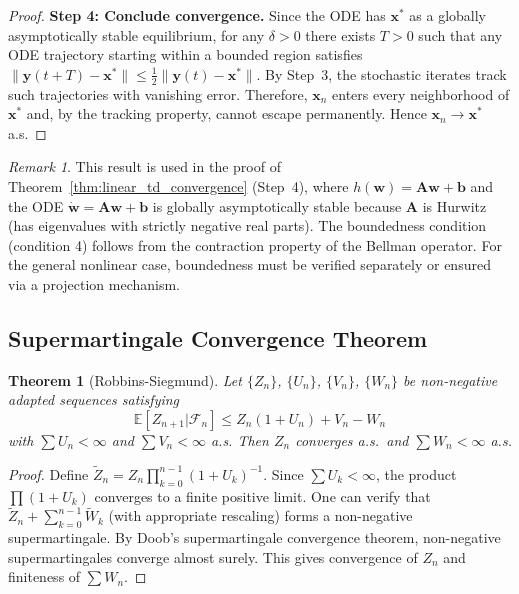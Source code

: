 \documentclass[11pt,a4paper]{article}
\theoremstyle{definition}
\theoremstyle{plain}
\newtheorem{theorem}{Theorem}[section]
\theoremstyle{remark}
\newtheorem{remark}{Remark}[section]
\newcommand{\E}{\mathbb{E}}
\begin{document}
\begin{proof}
\textbf{Step 4: Conclude convergence.} Since the ODE has $\bm{x}^*$ as a globally asymptotically stable equilibrium, for any $\delta > 0$ there exists $T > 0$ such that any ODE trajectory starting within a bounded region satisfies $\|\bm{y}(t+T) - \bm{x}^*\| \leq \frac{1}{2}\|\bm{y}(t) - \bm{x}^*\|$. By Step~3, the stochastic iterates track such trajectories with vanishing error. Therefore, $\bm{x}_n$ enters every neighborhood of $\bm{x}^*$ and, by the tracking property, cannot escape permanently. Hence $\bm{x}_n \to \bm{x}^*$ a.s.
\end{proof}

\begin{remark}
This result is used in the proof of Theorem~\ref{thm:linear_td_convergence} (Step~4), where $h(\bm{w}) = \bm{A}\bm{w} + \bm{b}$ and the ODE $\dot{\bm{w}} = \bm{A}\bm{w} + \bm{b}$ is globally asymptotically stable because $\bm{A}$ is Hurwitz (has eigenvalues with strictly negative real parts). The boundedness condition (condition 4) follows from the contraction property of the Bellman operator. For the general nonlinear case, boundedness must be verified separately or ensured via a projection mechanism.
\end{remark}

\subsection{Supermartingale Convergence Theorem}
\label{app:supermartingale}

\begin{theorem}[Robbins-Siegmund]
\label{thm:supermartingale}
Let $\{Z_n\}$, $\{U_n\}$, $\{V_n\}$, $\{W_n\}$ be non-negative adapted sequences satisfying
\begin{equation}
    \E[Z_{n+1} | \mathcal{F}_n] \leq Z_n(1 + U_n) + V_n - W_n
\end{equation}
with $\sum U_n < \infty$ and $\sum V_n < \infty$ a.s. Then $Z_n$ converges a.s.\ and $\sum W_n < \infty$ a.s.
\end{theorem}

\begin{proof}
Define $\tilde{Z}_n = Z_n \prod_{k=0}^{n-1}(1+U_k)^{-1}$. Since $\sum U_k < \infty$, the product $\prod(1+U_k)$ converges to a finite positive limit. One can verify that $\tilde{Z}_n + \sum_{k=0}^{n-1} \tilde{W}_k$ (with appropriate rescaling) forms a non-negative supermartingale. By Doob's supermartingale convergence theorem, non-negative supermartingales converge almost surely. This gives convergence of $Z_n$ and finiteness of $\sum W_n$.
\end{proof}
\end{document}
